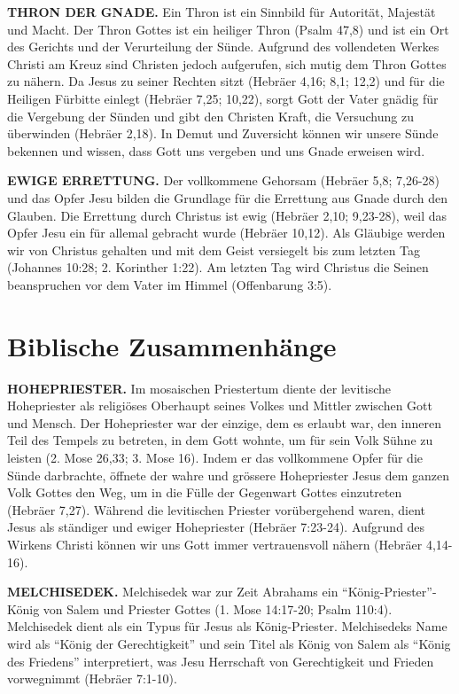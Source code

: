 \documentclass[
  12pt,
]{krantz}
\begin{document}
\textbf{THRON DER GNADE.} Ein Thron ist ein Sinnbild für Autorität, Majestät und Macht. Der Thron Gottes ist ein heiliger Thron (Psalm 47,8) und ist ein Ort des Gerichts und der Verurteilung der Sünde. Aufgrund des vollendeten Werkes Christi am Kreuz sind Christen jedoch aufgerufen, sich mutig dem Thron Gottes zu nähern. Da Jesus zu seiner Rechten sitzt (Hebräer 4,16; 8,1; 12,2) und für die Heiligen Fürbitte einlegt (Hebräer 7,25; 10,22), sorgt Gott der Vater gnädig für die Vergebung der Sünden und gibt den Christen Kraft, die Versuchung zu überwinden (Hebräer 2,18). In Demut und Zuversicht können wir unsere Sünde bekennen und wissen, dass Gott uns vergeben und uns Gnade erweisen wird.

\textbf{EWIGE ERRETTUNG.} Der vollkommene Gehorsam (Hebräer 5,8; 7,26-28) und das Opfer Jesu bilden die Grundlage für die Errettung aus Gnade durch den Glauben. Die Errettung durch Christus ist ewig (Hebräer 2,10; 9,23-28), weil das Opfer Jesu ein für allemal gebracht wurde (Hebräer 10,12). Als Gläubige werden wir von Christus gehalten und mit dem Geist versiegelt bis zum letzten Tag (Johannes 10:28; 2. Korinther 1:22). Am letzten Tag wird Christus die Seinen beanspruchen vor dem Vater im Himmel (Offenbarung 3:5).

\hypertarget{biblische-zusammenhuxe4nge}{%
\section{Biblische Zusammenhänge}\label{biblische-zusammenhuxe4nge}}

\textbf{HOHEPRIESTER.} Im mosaischen Priestertum diente der levitische Hohepriester als religiöses Oberhaupt seines Volkes und Mittler zwischen Gott und Mensch. Der Hohepriester war der einzige, dem es erlaubt war, den inneren Teil des Tempels zu betreten, in dem Gott wohnte, um für sein Volk Sühne zu leisten (2. Mose 26,33; 3. Mose 16). Indem er das vollkommene Opfer für die Sünde darbrachte, öffnete der wahre und grössere Hohepriester Jesus dem ganzen Volk Gottes den Weg, um in die Fülle der Gegenwart Gottes einzutreten (Hebräer 7,27). Während die levitischen Priester vorübergehend waren, dient Jesus als ständiger und ewiger Hohepriester (Hebräer 7:23-24). Aufgrund des Wirkens Christi können wir uns Gott immer vertrauensvoll nähern (Hebräer 4,14-16).

\textbf{MELCHISEDEK.} Melchisedek war zur Zeit Abrahams ein ``König-Priester''-König von Salem und Priester Gottes (1. Mose 14:17-20; Psalm 110:4). Melchisedek dient als ein Typus für Jesus als König-Priester. Melchisedeks Name wird als ``König der Gerechtigkeit'' und sein Titel als König von Salem als ``König des Friedens'' interpretiert, was Jesu Herrschaft von Gerechtigkeit und Frieden vorwegnimmt (Hebräer 7:1-10).
\end{document}
